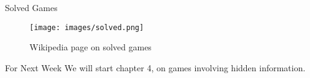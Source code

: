 \documentclass[
  ignorenonframetext,
]{beamer}
\begin{document}
\begin{frame}{Solved Games}
\protect\hypertarget{solved-games}{}
\begin{figure}
\centering
\texttt{[image: images/solved.png]}
\caption{Wikipedia page on solved games}
\end{figure}
\end{frame}

\begin{frame}{For Next Week}
\protect\hypertarget{for-next-week}{}
We will start chapter 4, on games involving hidden information.
\end{frame}
\end{document}
